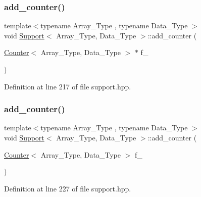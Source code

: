 \subsubsection{\texorpdfstring{add\+\_\+counter()}{add\_counter()}\hspace{0.1cm}{\footnotesize\ttfamily [1/2]}}
{\footnotesize\ttfamily template$<$typename Array\+\_\+\+Type , typename Data\+\_\+\+Type $>$ \\
void \hyperlink{class_support}{Support}$<$ Array\+\_\+\+Type, Data\+\_\+\+Type $>$\+::add\+\_\+counter (\begin{DoxyParamCaption}\item[{\hyperlink{class_counter}{Counter}$<$ Array\+\_\+\+Type, Data\+\_\+\+Type $>$ $\ast$}]{f\+\_\+ }\end{DoxyParamCaption})\hspace{0.3cm}{\ttfamily [inline]}}



Definition at line 217 of file support.\+hpp.

\mbox{\label{class_support_aa8680937a0237286a8b0401bca07cbf6}} 
\subsubsection{\texorpdfstring{add\+\_\+counter()}{add\_counter()}\hspace{0.1cm}{\footnotesize\ttfamily [2/2]}}
{\footnotesize\ttfamily template$<$typename Array\+\_\+\+Type , typename Data\+\_\+\+Type $>$ \\
void \hyperlink{class_support}{Support}$<$ Array\+\_\+\+Type, Data\+\_\+\+Type $>$\+::add\+\_\+counter (\begin{DoxyParamCaption}\item[{\hyperlink{class_counter}{Counter}$<$ Array\+\_\+\+Type, Data\+\_\+\+Type $>$}]{f\+\_\+ }\end{DoxyParamCaption})\hspace{0.3cm}{\ttfamily [inline]}}



Definition at line 227 of file support.\+hpp.

\mbox{\label{class_support_ab5261952be0746f188ee024e3e8c26c1}} 
